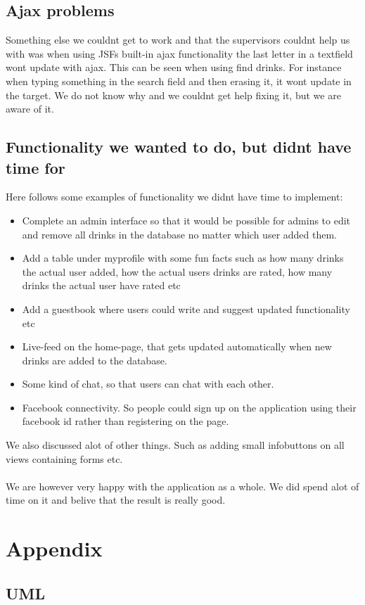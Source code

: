 \documentclass[a4paper]{article}
\begin{document}
\subsection{Ajax problems}
Something else we couldnt get to work and that the supervisors couldnt help us with was when using JSFs built-in ajax functionality the last letter in a textfield wont update with ajax.
This can be seen when using find drinks. For instance when typing something in the search field and then erasing it, it wont update in the target. We do not know why and we couldnt get help fixing it, but we are aware of it.

\subsection{Functionality we wanted to do, but didnt have time for}
Here follows some examples of functionality we didnt have time to implement:
\begin{itemize}
\item Complete an admin interface so that it would be possible for admins to edit and remove all drinks in the database no matter which user added them.
\item Add a table under myprofile with some fun facts such as how many drinks the actual user added, how the actual users drinks are rated, how many drinks the actual user have rated etc
\item Add a guestbook where users could write and suggest updated functionality etc
\item Live-feed on the home-page, that gets updated automatically when new drinks are added to the database.
\item Some kind of chat, so that users can chat with each other.
\item Facebook connectivity. So people could sign up on the application using their facebook id rather than registering on the page.
\end{itemize}

We also discussed alot of other things. Such as adding small infobuttons on all views containing forms etc. \\
\\
We are however very happy with the application as a whole. We did spend alot of time on it and belive that the result is really good.

\section{Appendix}
\subsection{UML}
\end{document}
